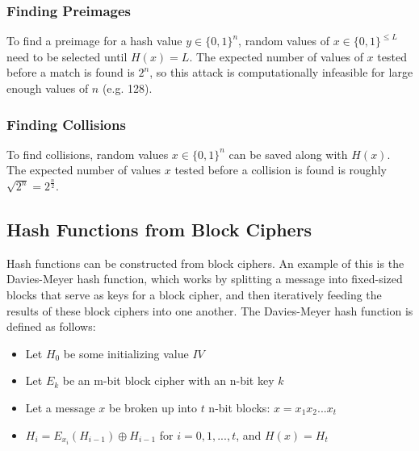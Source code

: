 \documentclass[12pt,titlepage]{article}
\begin{document}
      \subsubsection{Finding Preimages}
        To find a preimage for a hash value $y \in \{0, 1\}^n$, random values of $x \in \{0, 1\}^{\leq L}$ need to be selected until $H(x) = L$. The expected number of values of
        $x$ tested before a match is found is $2^n$, so this attack is computationally infeasible for large enough values of $n$ (e.g. 128).

      \subsubsection{Finding Collisions}
        To find collisions, random values $x \in \{0, 1\}^n$ can be saved along with $H(x)$. The expected number of values $x$ tested before a collision is found is roughly
        $\sqrt{2^n} = 2^{\frac{n}{2}}$.

    \subsection{Hash Functions from Block Ciphers}
      Hash functions can be constructed from block ciphers. An example of this is the Davies-Meyer hash function, which works by splitting a message into fixed-sized blocks
      that serve as keys for a block cipher, and then iteratively feeding the results of these block ciphers into one another. The Davies-Meyer hash function is defined as
      follows:
      \begin{itemize}
        \item Let $H_0$ be some initializing value $IV$
        \item Let $E_k$ be an m-bit block cipher with an n-bit key $k$
        \item Let a message $x$ be broken up into $t$ n-bit blocks: $x = x_1x_2 . . . x_t$
        \item $H_i = E_{x_i}(H_{i-1}) \oplus H_{i-1}$ for $i = 0, 1, ..., t$, and $H(x) = H_t$
      \end{itemize}
\end{document}
